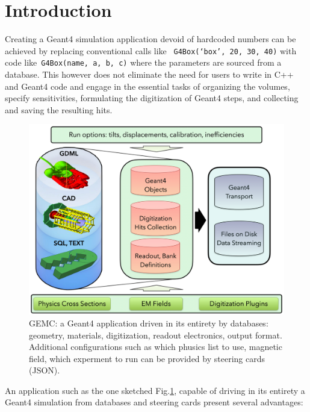 \section{Introduction}
\label{sec:intro}

Creating a Geant4 simulation application devoid of hardcoded numbers can be achieved
by replacing conventional calls like ~\verb|G4Box(‘box’, 20, 30, 40)| with
code like~\verb|G4Box(name, a, b, c)| where the parameters are sourced from a database.
This however does not eliminate the need for users to write in C++ and Geant4 code
and engage in the essential tasks of organizing the volumes, specify sensitivities,
formulating the digitization of Geant4 steps, and collecting and saving the resulting hits.


\begin{figure}[h]
    \centering
    \includegraphics[width=.95\textwidth]{img/db}
    \caption{GEMC: a Geant4 application driven in its entirety by databases: geometry, materials,
        digitization, readout electronics, output format. Additional configurations such as which phusics
        list to use, magnetic field, which experment to run can be provided by steering cards (JSON).}
    \label{fig:db}
\end{figure}

An application such as the one sketched Fig.\ref{fig:db}, capable of driving in its entirety
a Geant4 simulation from databases and steering cards present several advantages:

